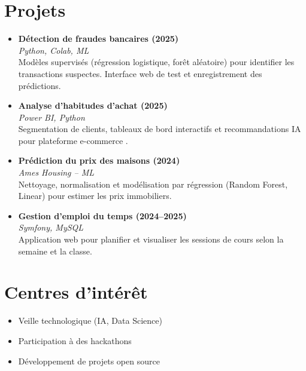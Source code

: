 \documentclass[a4paper,12pt]{article}
\begin{document}
\hfill
\begin{minipage}[t]{0.58\textwidth}

\section*{Projets}
\begin{itemize}[leftmargin=*, label={\color{secondarycolor}\scriptsize{}}]
  \item \textbf{Détection de fraudes bancaires (2025)}\\
  \textit{Python, Colab, ML}\\
  Modèles supervisés (régression logistique, forêt aléatoire) pour identifier les transactions suspectes. Interface web de test et enregistrement des prédictions.
  \vspace{4pt}
  
  \item \textbf{Analyse d'habitudes d'achat (2025)}\\
  \textit{Power BI, Python}\\
  Segmentation de clients, tableaux de bord interactifs et recommandations IA pour plateforme e-commerce .
  \vspace{4pt}
  
  \item \textbf{Prédiction du prix des maisons (2024)}\\
  \textit{Ames Housing – ML}\\
  Nettoyage, normalisation et modélisation par régression (Random Forest, Linear) pour estimer les prix immobiliers.
  \vspace{4pt}
  
  \item \textbf{Gestion d'emploi du temps (2024–2025)}\\
  \textit{Symfony, MySQL}\\
  Application web pour planifier et visualiser les sessions de cours selon la semaine et la classe.
\end{itemize}

\section*{Centres d'intérêt}
\begin{itemize}[leftmargin=*, label={\color{secondarycolor}\scriptsize{}}]
  \item Veille technologique (IA, Data Science)
  \item Participation à des hackathons
  \item Développement de projets open source
\end{itemize}

\end{minipage}
\end{document}
